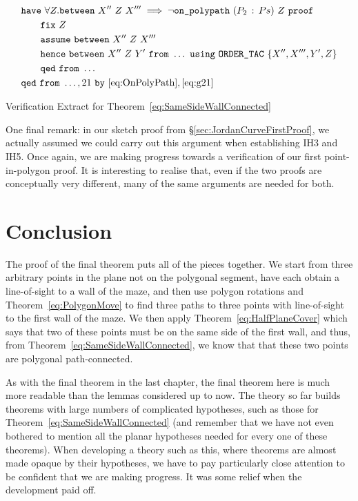 \begin{boxedfigure}
\begin{align*}
  &\code{have}\ \forall Z. \between{X''}{Z}{X'''} \implies \neg\code{on\_polypath}\ (\cons{P_2}{Ps})\ Z\ \code{proof}\\
  &\qquad \code{fix}\ Z\\
  &\qquad \code{assume}\ \between{X''}{Z}{X'''}\\
  &\qquad \code{hence}\ \between{X''}{Z}{Y'}\ \code{from}\ \ldots\ \code{using}\ \code{ORDER\_TAC}\ \{X'',X''',Y',Z\}\\
  &\qquad \code{qed}\ \code{from}\ \ldots\\
  &\code{qed}\ \code{from}\ \ldots,21\ \code{by}\ \eqref{eq:OnPolyPath},\eqref{eq:g21}
\end{align*}
\caption{Verification Extract for Theorem~\ref{eq:SameSideWallConnected}}
\label{fig:SameSideWallConnectedExtract}
\end{boxedfigure}

One final remark: in our sketch proof from \S\ref{sec:JordanCurveFirstProof}, we actually assumed we could carry out this argument when establishing IH3 and IH5. Once again, we are making progress towards a verification of our first point-in-polygon proof. It is interesting to realise that, even if the two proofs are conceptually very different, many of the same arguments are needed for both.

\section{Conclusion}
The proof of the final theorem puts all of the pieces together. We start from three arbitrary points in the plane not on the polygonal segment, have each obtain a line-of-sight to a wall of the maze, and then use polygon rotations and Theorem~\ref{eq:PolygonMove} to find three paths to three points with line-of-sight to the first wall of the maze. We then apply  Theorem~\ref{eq:HalfPlaneCover} which says that two of these points must be on the same side of the first wall, and thus, from Theorem~\ref{eq:SameSideWallConnected}, we know that that these two points are polygonal path-connected.

As with the final theorem in the last chapter, the final theorem here is much more readable than the lemmas considered up to now. The theory so far builds theorems with large numbers of complicated hypotheses, such as those for Theorem~\ref{eq:SameSideWallConnected} (and remember that we have not even bothered to mention all the planar hypotheses needed for every one of these theorems). When developing a theory such as this, where theorems are almost made opaque by their hypotheses, we have to pay particularly close attention to be confident that we are making progress. It was some relief when the development paid off.

